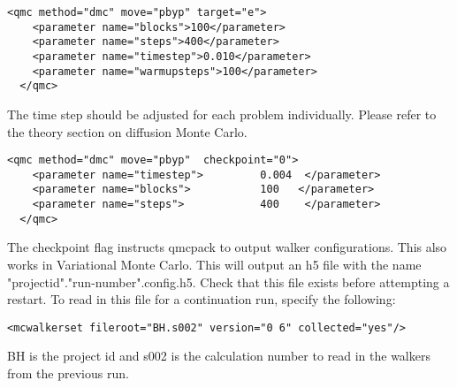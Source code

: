 \begin{itemize}



\end{itemize}

\begin{lstlisting}[style=QMCPXML,caption=The following is an example of a very simple DMC section. ]
  <qmc method="dmc" move="pbyp" target="e">
    <parameter name="blocks">100</parameter>
    <parameter name="steps">400</parameter>
    <parameter name="timestep">0.010</parameter>
    <parameter name="warmupsteps">100</parameter>
  </qmc>
\end{lstlisting}
The time step should be adjusted for each problem individually.  Please refer to the theory section
on diffusion Monte Carlo.


\begin{lstlisting}[style=QMCPXML,caption=The following is an example of running a simulation that can be restarted . ]
  <qmc method="dmc" move="pbyp"  checkpoint="0">
    <parameter name="timestep">         0.004  </parameter>
    <parameter name="blocks">           100   </parameter>
    <parameter name="steps">            400    </parameter>
  </qmc>
\end{lstlisting}
The checkpoint flag instructs qmcpack to output walker configurations.  This also
works in Variational Monte Carlo.  This will output an h5 file with the name "projectid"."run-number".config.h5.
Check that this file exists before attempting a restart.
To read in this file for a continuation run, specify the following:
\begin{lstlisting}[caption=Restart (read walkers from previous run) ]
 <mcwalkerset fileroot="BH.s002" version="0 6" collected="yes"/>
\end{lstlisting}
BH is the project id and s002 is the calculation number to read in the walkers from the previous run.\\

